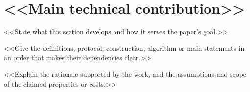\section{<<Main technical contribution>>}\label{sec:construction}
<<State what this section develops and how it serves the paper's goal.>>

<<Give the definitions, protocol, construction, algorithm or main statements
in an order that makes their dependencies clear.>>

<<Explain the rationale supported by the work, and the assumptions and scope of
the claimed properties or costs.>>
